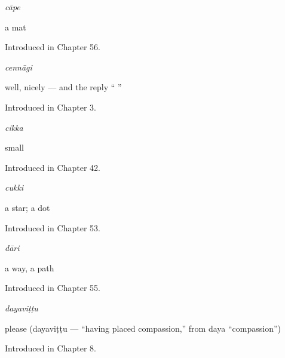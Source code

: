 \noindent\begin{minipage}[t]{\linewidth}
\raggedright
\textbf{}\enspace\emph{cāpe}\par
\small a mat\par
\footnotesize Introduced in Chapter 56.
\end{minipage}\par\medskip

\noindent\begin{minipage}[t]{\linewidth}
\raggedright
\textbf{}\enspace\emph{cennāgi}\par
\small well, nicely — and the reply \textquotedblleft{} \textquotedblright{}\par
\footnotesize Introduced in Chapter 3.
\end{minipage}\par\medskip

\noindent\begin{minipage}[t]{\linewidth}
\raggedright
\textbf{}\enspace\emph{cikka}\par
\small small\par
\footnotesize Introduced in Chapter 42.
\end{minipage}\par\medskip

\noindent\begin{minipage}[t]{\linewidth}
\raggedright
\textbf{}\enspace\emph{cukki}\par
\small a star; a dot\par
\footnotesize Introduced in Chapter 53.
\end{minipage}\par\medskip

\noindent\begin{minipage}[t]{\linewidth}
\raggedright
\textbf{}\enspace\emph{dāri}\par
\small a way, a path\par
\footnotesize Introduced in Chapter 55.
\end{minipage}\par\medskip

\noindent\begin{minipage}[t]{\linewidth}
\raggedright
\textbf{}\enspace\emph{dayaviṭṭu}\par
\small please (dayaviṭṭu — \textquotedblleft{}having placed compassion,\textquotedblright{} from  daya \textquotedblleft{}compassion\textquotedblright{})\par
\footnotesize Introduced in Chapter 8.
\end{minipage}\par\medskip

